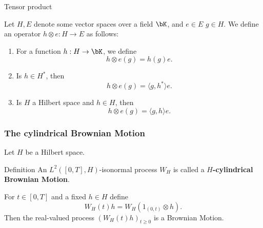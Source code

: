 \begin{frame}
    {Tensor product}
    
    Let $H, E$ denote some vector spaces over a field $\bK$, and $e \in E$ $g \in H$. We
    define an operator $h \otimes e : H \to E$ as follows:

    \begin{enumerate}
        \item For a function $h: H \to \bK$, we define
            \begin{equation*}
                h \otimes e (g) = h(g) e.
            \end{equation*} 
        \item Is $h \in H^*$, then
            \begin{equation*}
                h \otimes e (g) = \langle g, h^* \rangle e.
            \end{equation*}
        \item Is $H$ a Hilbert space and $h \in H$, then
            \begin{equation*}
                h \otimes e (g) = \langle g, h \rangle e. 
            \end{equation*}
    \end{enumerate}
\end{frame}


\begin{frame}
    \frametitle{The cylindrical Brownian Motion}
    
    Let $H$ be a Hilbert space. 

    \begin{block}{Definition}
        An $L^2([0,T], H)$-isonormal process $W_H$ is called a
        \textbf{$H$-cylindrical Brownian Motion}.  
    \end{block}

    For $t \in [0,T]$ and a fixed $h \in H$ define
    \begin{equation*}
        W_H(t)h = W_H \left( 1_{(0,t)} \otimes h \right).
    \end{equation*}
    Then the real-valued process $(W_H(t)h)_{t\geq 0}$ is a Brownian Motion.
\end{frame}


